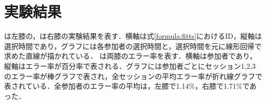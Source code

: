 \section{実験結果}
は左膝の，は右膝の実験結果を表す．横軸は式\ref{formula:fitts}におけるID，縦軸は選択時間であり，グラフには各参加者の選択時間と，選択時間を元に線形回帰で求めた直線が描かれている．
は両膝のエラー率を表す．横軸は参加者であり，縦軸はエラー率が百分率で表される．グラフには参加者ごとにセッション1,2,3のエラー率が棒グラフで表され，全セッションの平均エラー率が折れ線グラフで表されている．全参加者のエラー率の平均は，左膝で1.14\%，右膝で1.71\%であった．


